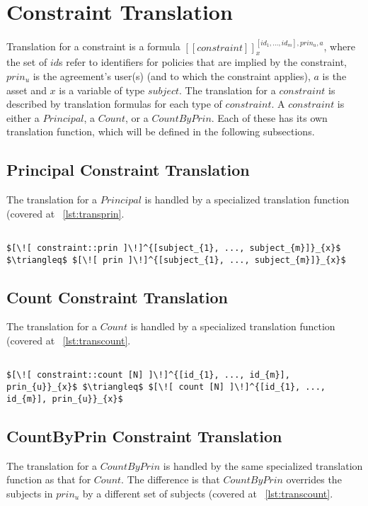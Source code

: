 \section{Constraint Translation}

Translation for a constraint is a formula $[\![constraint]\!]^{[id_{1}, ..., id_{m}], prin_{u}, a}_{x}$, where the set of $id$s refer to identifiers for policies that are implied by the constraint, $prin_{u}$ is the agreement's user(s) (and to which the constraint applies), $a$ is the asset and $x$ is a variable of type $subject$. The translation for a $constraint$ is described by translation formulas for each type of $constraint$. A $constraint$ is either a $Principal$, a $Count$, or a $CountByPrin$. Each of these has its own translation function, which will be defined in the following subsections.

\subsection{Principal Constraint Translation}
The translation for a $Principal$ is handled by a specialized translation function (covered at ~\ref{lst:transprin}.   

\lstset{mathescape, language=AST}  
\begin{lstlisting}[frame=single, caption={Constraint Translation {$\colon$} Principal},label={lst:transconstraintPrin}]

$[\![ constraint::prin ]\!]^{[subject_{1}, ..., subject_{m}]}_{x}$ $\triangleq$ $[\![ prin ]\!]^{[subject_{1}, ..., subject_{m}]}_{x}$ 
\end{lstlisting}

\subsection{Count Constraint Translation}
The translation for a $Count$ is handled by a specialized translation function (covered at ~\ref{lst:transcount}.

\lstset{mathescape, language=AST}  
\begin{lstlisting}[frame=single, caption={Constraint Translation {$\colon$} Count},label={lst:transconstraintCount}]

$[\![ constraint::count [N] ]\!]^{[id_{1}, ..., id_{m}], prin_{u}}_{x}$ $\triangleq$ $[\![ count [N] ]\!]^{[id_{1}, ..., id_{m}], prin_{u}}_{x}$ 
\end{lstlisting}

\subsection{CountByPrin Constraint Translation}
The translation for a $CountByPrin$ is handled by the same specialized translation function as that for $Count$. The difference is that $CountByPrin$ overrides the subjects in $prin_{u}$ by a different set of subjects (covered at ~\ref{lst:transcount}.

